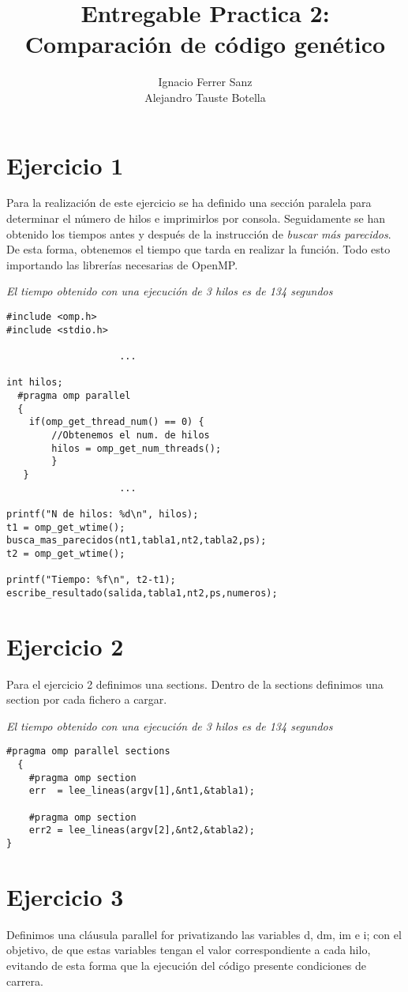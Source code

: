 \documentclass[11pt]{article}
\title{\textbf{Entregable Practica 2: Comparación de código genético}\\ }
\author{Ignacio Ferrer Sanz\\
		Alejandro Tauste Botella}
\begin{document}
\maketitle

\section*{Ejercicio 1}
Para la realización de este ejercicio se ha definido una sección paralela para determinar el número de hilos e imprimirlos por consola. Seguidamente se han obtenido los tiempos antes y después de la instrucción de \emph{buscar más parecidos}. De esta forma, obtenemos el tiempo que tarda en realizar la función. Todo esto importando las librerías necesarias de OpenMP.

\emph{El tiempo obtenido con una ejecución de 3 hilos es de 134 segundos}
\begin{lstlisting}
#include <omp.h>
#include <stdio.h>

					...
					
int hilos;
  #pragma omp parallel 
  {
    if(omp_get_thread_num() == 0) {
      	//Obtenemos el num. de hilos
      	hilos = omp_get_num_threads();
  		}
   }
					...

printf("N de hilos: %d\n", hilos);
t1 = omp_get_wtime();
busca_mas_parecidos(nt1,tabla1,nt2,tabla2,ps);
t2 = omp_get_wtime();

printf("Tiempo: %f\n", t2-t1);
escribe_resultado(salida,tabla1,nt2,ps,numeros);

\end{lstlisting}

\section*{Ejercicio 2}
Para el ejercicio 2 definimos una sections. Dentro de la sections definimos una section por cada fichero a cargar.

\emph{El tiempo obtenido con una ejecución de 3 hilos es de 134 segundos}
\begin{lstlisting}
#pragma omp parallel sections 
  {
	#pragma omp section
  	err  = lee_lineas(argv[1],&nt1,&tabla1);

  	#pragma omp section  
  	err2 = lee_lineas(argv[2],&nt2,&tabla2);
}
\end{lstlisting}

\pagebreak

\section*{Ejercicio 3}
Definimos una cláusula parallel for privatizando las variables d, dm, im e i; con el objetivo, de que estas variables tengan el valor correspondiente a cada hilo, evitando de esta forma que la ejecución del código presente condiciones de carrera.
\end{document}
